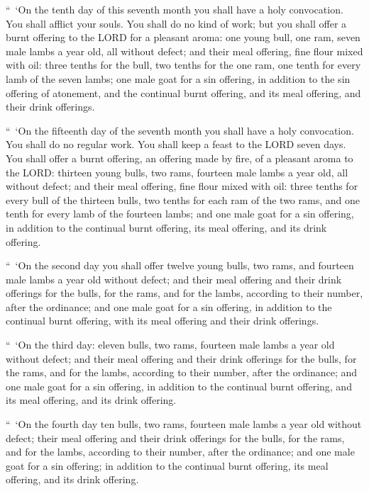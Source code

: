 \myverse{}“ ‘On the tenth day of this seventh month you shall have a holy
convocation. You shall afflict your souls. You shall do no kind of work;
\myverse{}but you shall offer a burnt offering to the LORD for a pleasant aroma: one
young bull, one ram, seven male lambs a year old, all without defect;
\myverse{}and their meal offering, fine flour mixed with oil: three tenths for the bull,
two tenths for the one ram,
\myverse{}one tenth for every lamb of the seven lambs;
\myverse{}one male goat for a sin offering, in addition to the sin offering of atonement,
and the continual burnt offering, and its meal offering, and their drink offerings.


\myverse{}“ ‘On the fifteenth day of the seventh month you shall have a
holy convocation. You shall do no regular work. You shall keep a feast to the LORD seven days.
\myverse{}You shall offer a burnt offering, an offering made by fire, of a pleasant
aroma to the LORD: thirteen young bulls, two rams, fourteen male lambs a year old, all without defect;
\myverse{}and their meal offering, fine flour mixed with oil: three tenths for every
bull of the thirteen bulls, two tenths for each ram of the two rams,
\myverse{}and one tenth for every lamb of the fourteen lambs;
\myverse{}and one male goat for a sin offering, in addition to the continual burnt
offering, its meal offering, and its drink offering.


\myverse{}“ ‘On the second day you shall offer twelve young bulls, two
rams, and fourteen male lambs a year old without defect;
\myverse{}and their meal offering and their drink offerings for the bulls, for the
rams, and for the lambs, according to their number, after the ordinance;
\myverse{}and one male goat for a sin offering, in addition to the continual burnt
offering, with its meal offering and their drink offerings.


\myverse{}“ ‘On the third day: eleven bulls, two rams, fourteen male lambs
a year old without defect;
\myverse{}and their meal offering and their drink offerings for the bulls, for the
rams, and for the lambs, according to their number, after the ordinance;
\myverse{}and one male goat for a sin offering, in addition to the continual burnt
offering, and its meal offering, and its drink offering.


\myverse{}“ ‘On the fourth day ten bulls, two rams, fourteen male lambs
a year old without defect;
\myverse{}their meal offering and their drink offerings for the bulls, for the rams,
and for the lambs, according to their number, after the ordinance;
\myverse{}and one male goat for a sin offering; in addition to the continual burnt
offering, its meal offering, and its drink offering.


